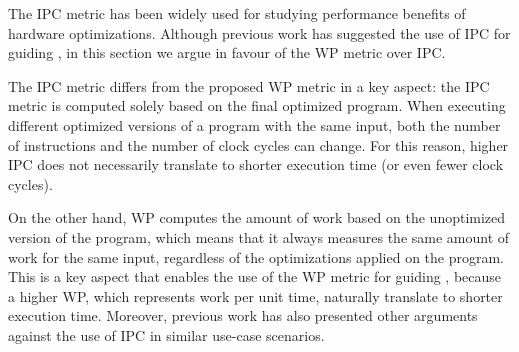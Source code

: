 
The IPC metric has been widely used for studying performance benefits of hardware optimizations.
Although previous work has suggested the use of IPC for guiding {\itercomp}, in this section we argue in favour of the WP metric over IPC.

The IPC metric differs from the proposed WP metric in a key aspect:
the IPC metric is computed solely based on the final optimized program.
When executing different optimized versions of a program with the same input, both the number of instructions and the number of clock cycles can change.
For this reason, higher IPC does not necessarily translate to shorter execution time (or even fewer clock cycles).

%

On the other hand, WP computes the amount of work based on the unoptimized version of the program, which means that it always measures the same amount of work for the same input, regardless of the optimizations applied on the program.
This is a key aspect that enables the use of the WP metric for guiding {\itercomp}, because a higher WP, which represents work per unit time, naturally translate to shorter execution time.
Moreover, previous work has also presented other arguments against the use of IPC in similar use-case scenarios. %
